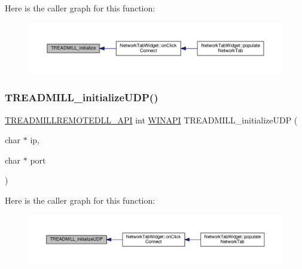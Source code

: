 Here is the caller graph for this function\+:
\nopagebreak
\begin{figure}[H]
\begin{center}
\leavevmode
\includegraphics[width=350pt]{treadmill-remote_8h_a9359937c6d3e08d705bc274f0f479032_icgraph}
\end{center}
\end{figure}
\mbox{\label{treadmill-remote_8h_a01211c9d8d73f3013e38c822be71871b}} 
\subsubsection{\texorpdfstring{T\+R\+E\+A\+D\+M\+I\+L\+L\+\_\+initialize\+U\+D\+P()}{TREADMILL\_initializeUDP()}}
{\footnotesize\ttfamily \hyperlink{treadmill-remote_8h_a227455497d4d32bfe49f1f795b27c6cc}{T\+R\+E\+A\+D\+M\+I\+L\+L\+R\+E\+M\+O\+T\+E\+D\+L\+L\+\_\+\+A\+PI} int \hyperlink{treadmill-remote_8h_a9aa60e1ead64be77ad551e745cbfd4d3}{W\+I\+N\+A\+PI} T\+R\+E\+A\+D\+M\+I\+L\+L\+\_\+initialize\+U\+DP (\begin{DoxyParamCaption}\item[{char $\ast$}]{ip,  }\item[{char $\ast$}]{port }\end{DoxyParamCaption})}

Here is the caller graph for this function\+:
\nopagebreak
\begin{figure}[H]
\begin{center}
\leavevmode
\includegraphics[width=350pt]{treadmill-remote_8h_a01211c9d8d73f3013e38c822be71871b_icgraph}
\end{center}
\end{figure}
\mbox{\label{treadmill-remote_8h_a2bd100ba2ff484a153eb10936b9385b5}} 
